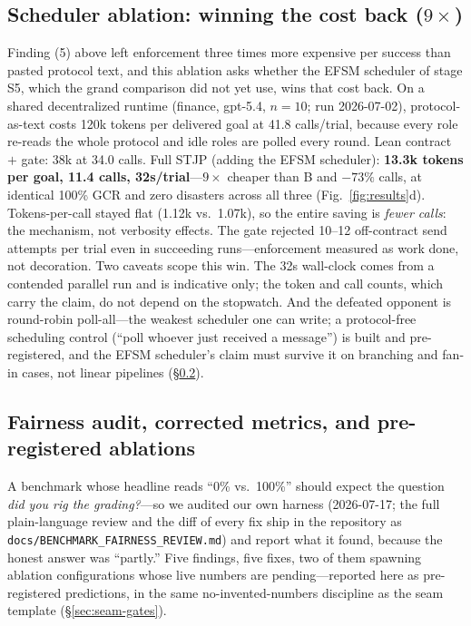 \documentclass{article}
\newcommand{\stjp}{\textsc{STJP}}
\begin{document}
\subsection{Scheduler ablation: winning the cost back ($9\times$)}
Finding (5) above left enforcement three times more expensive per success than pasted protocol text, and this ablation asks whether the EFSM scheduler of stage S5, which the grand comparison did not yet use, wins that cost back. On a shared decentralized runtime (finance, gpt-5.4, $n{=}10$; run 2026-07-02), protocol-as-text costs 120k tokens per delivered goal at 41.8 calls/trial, because every role re-reads the whole protocol and idle roles are polled every round. Lean contract $+$ gate: 38k at 34.0 calls. Full \stjp{} (adding the EFSM scheduler): \textbf{13.3k tokens per goal, 11.4 calls, 32s/trial}---$9\times$ cheaper than B and $-73\%$ calls, at identical 100\% GCR and zero disasters across all three (Fig.~\ref{fig:results}d). Tokens-per-call stayed flat (1.12k vs.\ 1.07k), so the entire saving is \emph{fewer calls}: the mechanism, not verbosity effects. The gate rejected 10--12 off-contract send attempts per trial even in succeeding runs---enforcement measured as work done, not decoration. Two caveats scope this win. The 32s wall-clock comes from a contended parallel run and is indicative only; the token and call counts, which carry the claim, do not depend on the stopwatch. And the defeated opponent is round-robin poll-all---the weakest scheduler one can write; a protocol-free scheduling control (``poll whoever just received a message'') is built and pre-registered, and the EFSM scheduler's claim must survive it on branching and fan-in cases, not linear pipelines (\S\ref{sec:fairaudit}).

\subsection{Fairness audit, corrected metrics, and pre-registered ablations}\label{sec:fairaudit}
A benchmark whose headline reads ``0\% vs.\ 100\%'' should expect the question \emph{did you rig the grading?}---so we audited our own harness (2026-07-17; the full plain-language review and the diff of every fix ship in the repository as \texttt{docs/BENCHMARK\_FAIRNESS\_REVIEW.md}) and report what it found, because the honest answer was ``partly.'' Five findings, five fixes, two of them spawning ablation configurations whose live numbers are pending---reported here as pre-registered predictions, in the same no-invented-numbers discipline as the seam template (\S\ref{sec:seam-gates}).
\end{document}
